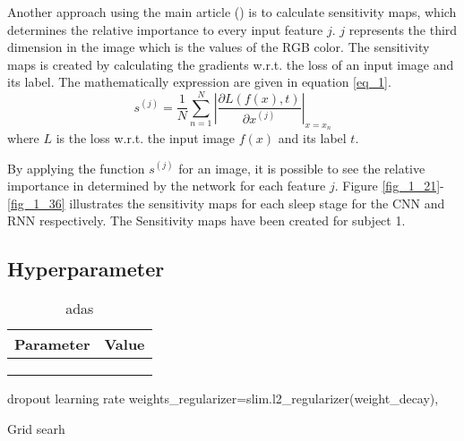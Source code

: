 Another approach using the main article (\cite{main_ar}) is to calculate sensitivity maps, which determines the relative importance to every input feature $j$. $j$ represents the third dimension in the image which is the values of the RGB color.
The sensitivity maps is created by calculating the gradients w.r.t. the loss of an input image and its label. The mathematically expression are given in equation \ref{eq_1}.
\begin{equation}
s^{\left(j\right)} = \frac { 1 }{ N  } \sum _{ n=1 }^{ N } \left| \frac { \partial L\left( f\left( x \right) ,t \right)  }{ \partial x^{ \left( j \right)  } }  \right| _{x=x_n}
\label{eq_1}
\end{equation}
where $L$ is the loss w.r.t. the input image $f\left(x\right)$ and its label $t$. 

By applying the function $s^{\left(j\right)}$ for an image, it is possible to see the relative importance in determined by the network for each feature $j$. 
Figure \ref{fig_1_21}-\ref{fig_1_36} illustrates the sensitivity maps for each sleep stage for the CNN and RNN respectively. The Sensitivity maps have been created for subject 1.



\subsection{Hyperparameter}


\begin{table}[th!]
\centering
\begin{tabular}{l | l}
Parameter &  Value\\\hline
 &  \\
 &  \\
 & 
\end{tabular}
\caption{adas}
\label{tab_hyper}
\end{table}
dropout 
learning rate
weights\_regularizer=slim.l2\_regularizer(weight\_decay),

Grid searh
